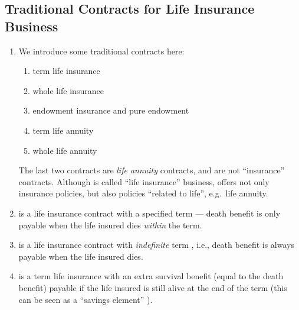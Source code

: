 \subsection{Traditional Contracts for Life Insurance Business}
\label{subsect:traditional-contracts}
\begin{enumerate}
\item We introduce some traditional contracts here:
\begin{enumerate}
\item term life insurance \textbar{}
\item whole life insurance \textbar{}
\item endowment insurance \textbar{}\textbar{} and pure endowment 
\item term life annuity \textbar{}
\item whole life annuity \textbar{}
\end{enumerate}
\begin{note}
The last two contracts are \emph{life annuity} contracts, and are
not ``insurance'' contracts. Although  is called ``life
insurance'' business,  offers not only insurance policies, but
also policies ``related to life'', e.g.\ life annuity.
\end{note}

\item {} is a life insurance contract
 with a specified term --- death benefit is
only payable when the life insured dies \emph{within} the term.

\item {} is a life insurance contract
 with \emph{indefinite} term , i.e., death
benefit is always payable when the life insured dies.

\item {} is a term life insurance \textbar{}
with an extra survival benefit  (equal to the death
benefit) payable if the life insured is still alive at the end of the term
(this can be seen as a ``savings element'' ).


\end{enumerate}
